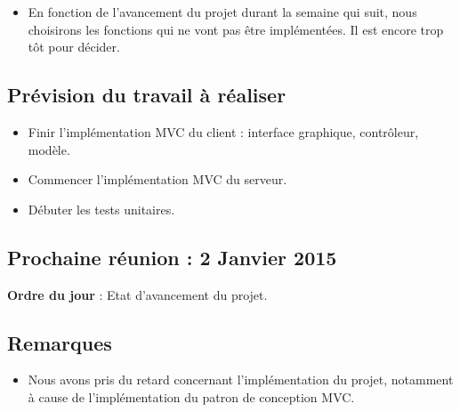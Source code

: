 \documentclass[12pt,a4paper]{article}
\begin{document}
\begin{itemize}[label = $\blacktriangleright$]
\item En fonction de l'avancement du projet durant la semaine qui suit, nous choisirons les fonctions qui ne vont pas être implémentées. Il est encore trop tôt pour décider.
\end{itemize}

\subsection*{Prévision du travail à réaliser}

\begin{itemize}[label = $\blacktriangleright$]
\item Finir l'implémentation MVC du client : interface graphique, contrôleur, modèle.
\item Commencer l'implémentation MVC du serveur.
\item Débuter les tests unitaires.
\end{itemize}

\subsection*{Prochaine réunion : 2 Janvier 2015}

\textbf{Ordre du jour} : Etat d'avancement du projet.\\

\subsection*{Remarques}

\begin{itemize}[label = $\blacktriangleright$]
\item Nous avons pris du retard concernant l'implémentation du projet, notamment à cause de l'implémentation du patron de conception MVC.
\end{itemize}
\end{document}
